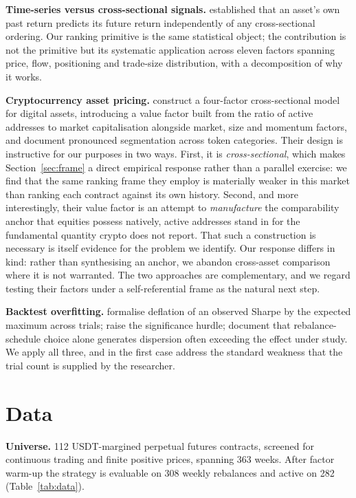 \documentclass[11pt,letterpaper]{article}
\begin{document}
\textbf{Time-series versus cross-sectional signals.} \citet{moskowitz2012}
established that an asset's own past return predicts its future return
independently of any cross-sectional ordering. Our ranking primitive is the same
statistical object; the contribution is not the primitive but its systematic
application across eleven factors spanning price, flow, positioning and
trade-size distribution, with a decomposition of why it works.

\textbf{Cryptocurrency asset pricing.} \citet{cong2026} construct a four-factor
cross-sectional model for digital assets, introducing a value factor built from
the ratio of active addresses to market capitalisation alongside market, size and
momentum factors, and document pronounced segmentation across token categories.
Their design is instructive for our purposes in two ways. First, it is
\emph{cross-sectional}, which makes Section~\ref{sec:frame} a direct empirical
response rather than a parallel exercise: we find that the same ranking frame
they employ is materially weaker in this market than ranking each contract
against its own history. Second, and more interestingly, their value factor is an
attempt to \emph{manufacture} the comparability anchor that equities possess
natively, active addresses stand in for the fundamental quantity crypto does not
report. That such a construction is necessary is itself evidence for the problem
we identify. Our response differs in kind: rather than synthesising an anchor, we
abandon cross-asset comparison where it is not warranted. The two approaches are
complementary, and we regard testing their factors under a self-referential frame
as the natural next step.

\textbf{Backtest overfitting.} \citet{bailey2014} formalise deflation of an
observed Sharpe by the expected maximum across trials; \citet{harvey2016} raise
the significance hurdle; \citet{hoffstein2019} document that rebalance-schedule
choice alone generates dispersion often exceeding the effect under study. We
apply all three, and in the first case address the standard weakness that the
trial count is supplied by the researcher.

\section{Data}

\textbf{Universe.} 112 USDT-margined perpetual futures contracts, screened for
continuous trading and finite positive prices, spanning 363 weeks. After factor
warm-up the strategy is evaluable on 308 weekly rebalances and active on 282
(Table~\ref{tab:data}).
\end{document}
